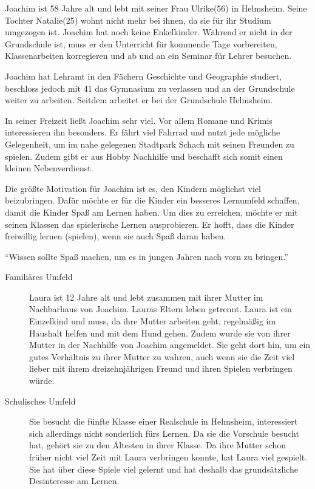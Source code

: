 \begin{description}
\begin{description}
			\item[Familiäres Umfeld]{Joachim ist 58 Jahre alt und lebt mit seiner Frau Ulrike(56) in Helmsheim. Seine Tochter Natalie(25) wohnt nicht mehr bei ihnen, da sie für ihr Studium umgezogen ist. Joachim hat noch keine Enkelkinder. Während er nicht in der Grundschule ist, muss er den Unterricht für kommende Tage vorbereiten, Klassenarbeiten korregieren und ab und an ein Seminar für Lehrer besuchen.}
			\item[Schulisches Umfeld]{Joachim hat Lehramt in den Fächern Geschichte und Geographie studiert, beschloss jedoch mit 41 das Gymnasium zu verlassen und an der Grundschule weiter zu arbeiten. Seitdem arbeitet er bei der Grundschule Helmsheim.}
			\item[Interessen und Hobbys]{In seiner Freizeit ließt Joachim sehr viel. Vor allem Romane und Krimis interessieren ihn besonders. Er fährt viel Fahrrad und nutzt jede mögliche Gelegenheit, um im nahe gelegenen Stadtpark Schach mit seinen Freunden zu spielen. Zudem gibt er aus Hobby Nachhilfe und beschafft sich somit einen kleinen Nebenverdienst.}
			\item[Motivation]{Die größte Motivation für Joachim ist es, den Kindern möglichst viel beizubringen. Dafür möchte er für die Kinder ein besseres Lernumfeld schaffen, damit die Kinder Spaß am Lernen haben. Um dies zu erreichen, möchte er mit seinen Klassen das spielerische Lernen ausprobieren. Er hofft, dass die Kinder freiwillig lernen (spielen), wenn sie auch Spaß daran haben.}
			\item{\enquote{Wissen sollte Spaß machen, um es in jungen Jahren nach vorn zu bringen.}}
		\end{description}
		\item[Laura Dietz: Die Rennfahrerin]<TODO: Bild>\hfill
		\begin{description}
			\item[Familiäres Umfeld]{Laura ist 12 Jahre alt und lebt zusammen mit ihrer Mutter im Nachbarhaus von Joachim. Lauras Eltern leben getrennt. Laura ist ein Einzelkind und muss, da ihre Mutter arbeiten geht, regelmäßig im Haushalt helfen und mit dem Hund gehen. Zudem wurde sie von ihrer Mutter in der Nachhilfe von Joachim angemeldet. Sie geht dort hin, um ein gutes Verhältnis zu ihrer Mutter zu wahren, auch wenn sie die Zeit viel lieber mit ihrem dreizehnjährigen Freund und ihren Spielen verbringen würde.}
			\item[Schulisches Umfeld]{Sie besucht die fünfte Klasse einer Realschule in Helmsheim, interessiert sich allerdings nicht sonderlich fürs Lernen. Da sie die Vorschule besucht hat, gehört sie zu den Ältesten in ihrer Klasse. Da ihre Mutter schon früher nicht viel Zeit mit Laura verbringen konnte, hat Laura viel gespielt. Sie hat über diese Spiele viel gelernt und hat deshalb das grundsätzliche Desinteresse am Lernen.}

\end{description}
\end{description}
